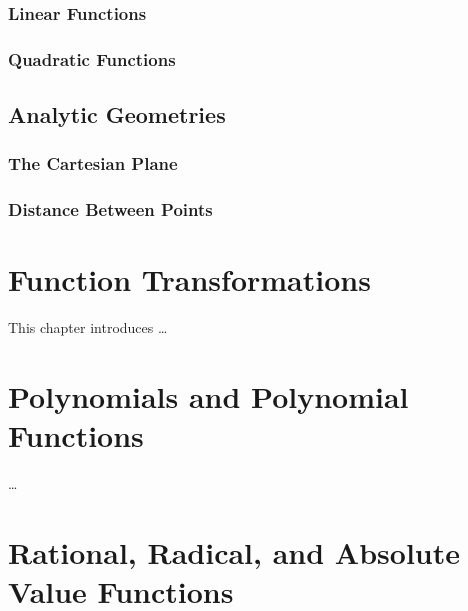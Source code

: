 \documentclass[
]{book}
\theoremstyle{definition}
\theoremstyle{definition}
\theoremstyle{definition}
\theoremstyle{definition}
\theoremstyle{remark}
\begin{document}
\hypertarget{linear-functions}{%
\subsection{Linear Functions}\label{linear-functions}}

\hypertarget{quadratic-functions}{%
\subsection{Quadratic Functions}\label{quadratic-functions}}

\hypertarget{analytic-geometries}{%
\section{Analytic Geometries}\label{analytic-geometries}}

\hypertarget{the-cartesian-plane}{%
\subsection{The Cartesian Plane}\label{the-cartesian-plane}}

\hypertarget{distance-between-points}{%
\subsection{Distance Between Points}\label{distance-between-points}}

\hypertarget{function-transformations}{%
\chapter{Function Transformations}\label{function-transformations}}

This chapter introduces \ldots{}

\hypertarget{polynomials-and-polynomial-functions}{%
\chapter{Polynomials and Polynomial Functions}\label{polynomials-and-polynomial-functions}}

\ldots{}

\hypertarget{rational-radical-and-absolute-value-functions}{%
\chapter{Rational, Radical, and Absolute Value Functions}\label{rational-radical-and-absolute-value-functions}}
\end{document}
